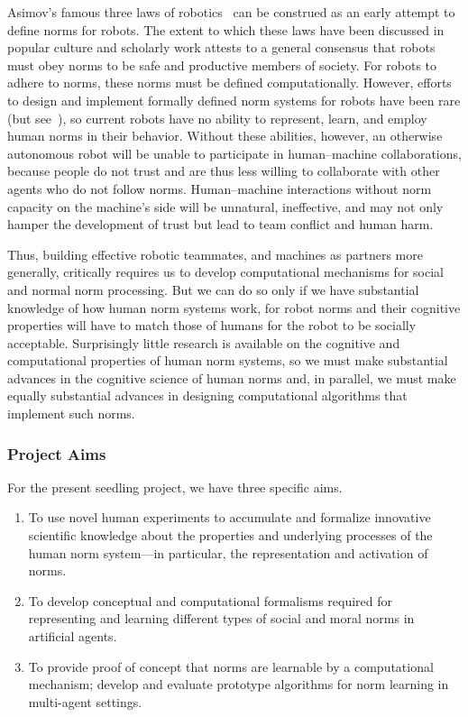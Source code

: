 \documentclass[12pt]{article}
\begin{document}
Asimov's famous three laws of robotics~\citep{asimov_1950} can be construed as an
early attempt to define norms for robots. The extent to which these
laws have been discussed in popular culture and scholarly work
attests to a general consensus that robots must obey norms to be safe
and productive members of society.  For robots to adhere to norms,
these norms must be defined computationally. However, efforts to
design and implement formally defined norm systems for robots have
been rare (but see~\citep{arkin09,scheutz_roman_2015}), so
current robots have no ability to represent, learn, and employ human
norms in their behavior.  Without these abilities, however, an
otherwise autonomous robot will be unable to participate in
human--machine collaborations, because people do not trust and are
thus less willing to collaborate with other agents who do not follow
norms. Human--machine interactions without norm capacity on the
machine's side will be unnatural, ineffective, and may not only hamper
the development of trust but lead to team conflict and human harm.

Thus, building effective robotic teammates, and machines as partners
more generally, critically requires us to develop computational
mechanisms for social and normal norm processing.  But we can do so
only if we have substantial knowledge of how human norm systems work,
for robot norms and their cognitive properties will have to match
those of humans for the robot to be socially acceptable.  Surprisingly
little research is available on the cognitive and computational
properties of human norm systems, so we must make substantial advances
in the cognitive science of human norms and, in parallel, we must make
equally substantial advances in designing computational algorithms
that implement such norms.


\subsubsection*{Project Aims}

For the present seedling project, we have three specific aims.

\vspace{-1mm}
\begin{enumerate}[label=\bfseries Aim \arabic*:, leftmargin=*,align=left]

\item To use novel human experiments to accumulate and formalize
  innovative scientific knowledge about the properties and underlying
  processes of the human norm system---in particular, the
  representation and activation of norms.

\item To develop conceptual and computational formalisms required for
  representing and learning different types of social and moral norms
  in artificial agents.

\item To provide proof of concept that norms are learnable by a
  computational mechanism; develop and evaluate prototype algorithms
  for norm learning in multi-agent settings.
\end{enumerate}
\end{document}
